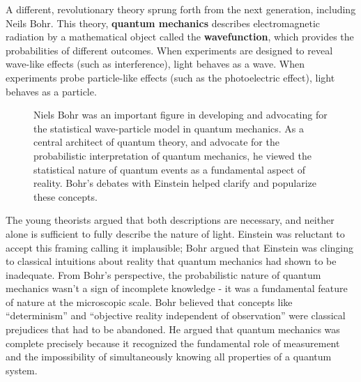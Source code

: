 \documentclass[
  letterpaper,
]{book}
\begin{document}
A different, revolutionary theory sprung forth from the next generation,
including Neils Bohr. This theory, \textbf{quantum mechanics} describes
electromagnetic radiation by a mathematical object called the
\textbf{wavefunction}, which provides the probabilities of different
outcomes. When experiments are designed to reveal wave-like effects
(such as interference), light behaves as a wave. When experiments probe
particle-like effects (such as the photoelectric effect), light behaves
as a particle.

\begin{figure}


\caption{\label{fig-bohr-einstein}Niels Bohr was an important figure in
developing and advocating for the statistical wave-particle model in
quantum mechanics. As a central architect of quantum theory, and
advocate for the probabilistic interpretation of quantum mechanics, he
viewed the statistical nature of quantum events as a fundamental aspect
of reality. Bohr's debates with Einstein helped clarify and popularize
these concepts.}

\end{figure}%

The young theorists argued that both descriptions are necessary, and
neither alone is sufficient to fully describe the nature of light.
Einstein was reluctant to accept this framing calling it implausible;
Bohr argued that Einstein was clinging to classical intuitions about
reality that quantum mechanics had shown to be inadequate. From Bohr's
perspective, the probabilistic nature of quantum mechanics wasn't a sign
of incomplete knowledge - it was a fundamental feature of nature at the
microscopic scale. Bohr believed that concepts like ``determinism'' and
``objective reality independent of observation'' were classical
prejudices that had to be abandoned. He argued that quantum mechanics
was complete precisely because it recognized the fundamental role of
measurement and the impossibility of simultaneously knowing all
properties of a quantum system.
\end{document}
